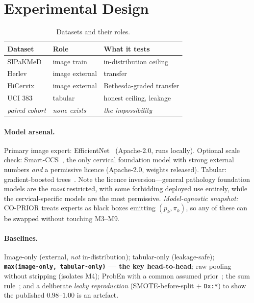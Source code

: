 \documentclass[sigplan,nonacm,screen]{acmart}
\begin{document}
\section{Experimental Design}

\begin{table}[t]
\caption{Datasets and their roles.}
\label{tab:data}
\footnotesize
\setlength{\tabcolsep}{4pt}
\begin{tabular}{@{}lp{2.0cm}p{2.4cm}@{}}
\toprule
\textbf{Dataset} & \textbf{Role} & \textbf{What it tests} \\
\midrule
SIPaKMeD~\cite{plissiti2018sipakmed} & image train & in-distribution ceiling \\
Herlev & image external & transfer \\
HiCervix~\cite{cai2024hicervix} & image external & Bethesda-graded transfer \\
UCI 383~\cite{fernandes2017transfer} & tabular & honest ceiling, leakage \\
\emph{paired cohort} & \emph{none exists} & \emph{the impossibility} \\
\bottomrule
\end{tabular}
\end{table}

\paragraph{Model arsenal.}
Primary image expert: EfficientNet~\cite{tan2019efficientnet} (Apache-2.0, runs locally). Optional scale check: Smart-CCS~\cite{zhang2025smartccs}, the only cervical foundation model with strong external numbers \emph{and} a permissive licence (Apache-2.0, weights released). Tabular: gradient-boosted trees~\cite{grinsztajn2022why}. Note the licence inversion---general pathology foundation models are the \emph{most} restricted, with some forbidding deployed use entirely, while the cervical-specific models are the most permissive. \emph{Model-agnostic snapshot:} CO-PRIOR treats experts as black boxes emitting $(p_k,\pi_k)$, so any of these can be swapped without touching M3--M9.

\paragraph{Baselines.} Image-only (external, \emph{not} in-distribution); tabular-only (leakage-safe); \textbf{\texttt{max(image-only, tabular-only)} --- the key head-to-head}; raw pooling without stripping (isolates M4); ProbEn with a common assumed prior~\cite{chen2022proben}; the sum rule~\cite{kittler1998combining}; and a deliberate \emph{leaky reproduction} (SMOTE-before-split $+$ \texttt{Dx:*}) to show the published $0.98$--$1.00$ is an artefact.
\end{document}
